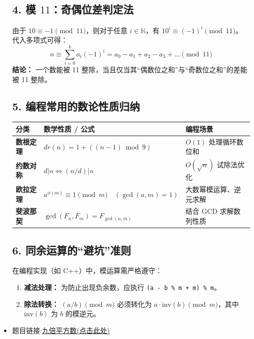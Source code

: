 \begin{itemize}
\subsection*{4. 模 $11$：奇偶位差判定法}
由于 $10 \equiv -1 \pmod{11}$，则对于任意 $i \in \mathbb{N}$，有 $10^i \equiv (-1)^i \pmod{11}$。
代入多项式可得：
\[ n \equiv \sum_{i=0}^{k} a_i (-1)^i = a_0 - a_1 + a_2 - a_3 + \dots \pmod{11} \]
\textbf{结论：} 一个数能被 11 整除，当且仅当其“偶数位之和”与“奇数位之和”的差能被 11 整除。

\subsection*{5. 编程常用的数论性质归纳}

\begin{table}[h]
	\centering
	\renewcommand{\arraystretch}{1.5}
	\begin{tabular}{|l|l|l|}
		\hline
		\textbf{分类} & \textbf{数学性质 / 公式} & \textbf{编程场景} \\ \hline
		\textbf{数根定理} & $dr(n) = 1 + ((n-1) \bmod 9)$ & $O(1)$ 处理循环数位和 \\ \hline
		\textbf{约数对称} & $d | n \iff (n/d) | n$ & $O(\sqrt{n})$ 试除法优化 \\ \hline
		\textbf{欧拉定理} & $a^{\phi(m)} \equiv 1 \pmod m \quad (\gcd(a,m)=1)$ & 大数幂模运算、逆元求解 \\ \hline
		\textbf{斐波那契} & $\gcd(F_n, F_m) = F_{\gcd(n,m)}$ & 结合 GCD 求解数列性质 \\ \hline
	\end{tabular}
\end{table}

\subsection*{6. 同余运算的“避坑”准则}
在编程实现（如 C++）中，模运算需严格遵守：
\begin{enumerate}
	\item \textbf{减法处理：} 为防止出现负余数，应执行 \texttt{(a - b \% m + m) \% m}。
	\item \textbf{除法转换：} $(a / b) \pmod m$ 必须转化为 $a \cdot \text{inv}(b) \pmod m$，其中 $\text{inv}(b)$ 为 $b$ 的模逆元。
\end{enumerate}
\item 题目链接:\href{https://www.nowcoder.com/practice/032c72fab5fe4a2ea8e11d40378a493d?tpId=385&tags=&title=&difficulty=0&judgeStatus=0&rp=0&sourceUrl=%2Fexam%2Foj%3Fpage%3D1%26tab%3D%25E7%25AE%2597%25E6%25B3%2595%25E5%25AD%25A6%25E4%25B9%25A0%25E7%25AF%2587%26topicId%3D385}{九倍平方数(点击此处)}


\end{itemize}
